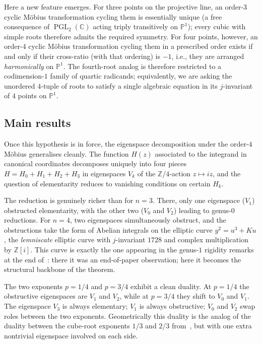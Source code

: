 \documentclass[11pt,a4paper]{article}
\theoremstyle{plain}
\theoremstyle{definition}
\theoremstyle{remark}
\newcommand{\C}{\mathbb{C}}
\newcommand{\Z}{\mathbb{Z}}
\newcommand{\PGL}{\operatorname{PGL}}
\begin{document}
Here a new feature emerges. For three points on the projective line, an order-$3$ cyclic Möbius transformation cycling them is essentially unique (a free consequence of $\PGL_2(\C)$ acting triply transitively on $\mathbb{P}^1$); every cubic with simple roots therefore admits the required symmetry. For four points, however, an order-$4$ cyclic Möbius transformation cycling them in a prescribed order exists if and only if their cross-ratio (with that ordering) is $-1$, i.e., they are arranged \emph{harmonically} on $\mathbb{P}^1$. The fourth-root analog is therefore restricted to a codimension-$1$ family of quartic radicands; equivalently, we are asking the unordered $4$-tuple of roots to satisfy a single algebraic equation in its $j$-invariant of $4$ points on $\mathbb{P}^1$.

\subsection*{Main results}

Once this hypothesis is in force, the eigenspace decomposition under the order-$4$ Möbius generalises cleanly. The function $H(z)$ associated to the integrand in canonical coordinates decomposes uniquely into four pieces $H = H_0 + H_1 + H_2 + H_3$ in eigenspaces $V_k$ of the $\Z/4$-action $z \mapsto iz$, and the question of elementarity reduces to vanishing conditions on certain $H_k$.

The reduction is genuinely richer than for $n=3$. There, only one eigenspace ($V_1$) obstructed elementarity, with the other two ($V_0$ and $V_2$) leading to genus-$0$ reductions. For $n=4$, two eigenspaces simultaneously obstruct, and the obstructions take the form of Abelian integrals on the elliptic curve $y^2 = u^3 + Ku$, the \emph{lemniscate} elliptic curve with $j$-invariant $1728$ and complex multiplication by $\Z[i]$. This curve is exactly the one appearing in the genus-$1$ rigidity remarks at the end of~\cite{GoursatCubic}: there it was an end-of-paper observation; here it becomes the structural backbone of the theorem.

The two exponents $p = 1/4$ and $p = 3/4$ exhibit a clean duality. At $p = 1/4$ the obstructive eigenspaces are $V_1$ and $V_2$, while at $p = 3/4$ they shift to $V_0$ and $V_1$. The eigenspace $V_3$ is always elementary; $V_1$ is always obstructive; $V_0$ and $V_2$ swap roles between the two exponents. Geometrically this duality is the analog of the duality between the cube-root exponents $1/3$ and $2/3$ from~\cite{GoursatCubic}, but with one extra nontrivial eigenspace involved on each side.
\end{document}
